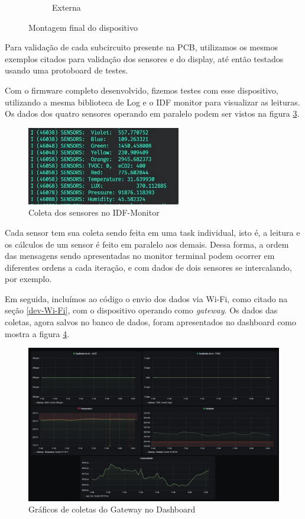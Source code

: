 \documentclass[../monografia.tex]{subfiles}
\begin{document}
\begin{figure}[h]
\begin{subfigure}{0.5\textwidth}
		\caption{Externa}
		\label{fig:externa}
	\end{subfigure}
	\caption{Montagem final do dispositivo}
	\label{fig:montagem-final}
\end{figure}

Para validação de cada subcircuito presente na PCB, utilizamos os mesmos exemplos citados para validação dos sensores e do display, até então testados usando uma protoboard de testes. 

Com o firmware completo desenvolvido, fizemos testes com esse dispositivo, utilizando a mesma biblioteca de Log e o IDF monitor para visualizar as leituras. Os dados dos quatro sensores operando em paralelo podem ser vistos na figura \ref{fig:monitor-sensors}.

\begin{figure}[h]
	\centering
	\includegraphics[width=0.6\textwidth]{monitor-sensors}
	\caption{Coleta dos sensores no IDF-Monitor}
	\label{fig:monitor-sensors}
\end{figure}

Cada sensor tem sua coleta sendo feita em uma task individual, isto é, a leitura e os cálculos de um sensor é feito em paralelo aos demais. Dessa forma, a ordem das mensagens sendo apresentadas no monitor terminal podem ocorrer em diferentes ordens a cada iteração, e com dados de dois sensores se intercalando, por exemplo. \newpage

Em seguida, incluímos ao código o envio dos dados via Wi-Fi, como citado na seção \ref{dev-Wi-Fi}, com o dispositivo operando como \textit{gateway}. Os dados das coletas, agora salvos no banco de dados, foram apresentados no dashboard como mostra a figura \ref{fig:dashboard-graphs}.

\begin{figure}[h]
	\centering
	\includegraphics[width=\textwidth]{dashboard-graphs}
	\caption{Gráficos de coletas do Gateway no Dashboard}
	\label{fig:dashboard-graphs}
\end{figure}
\end{document}
